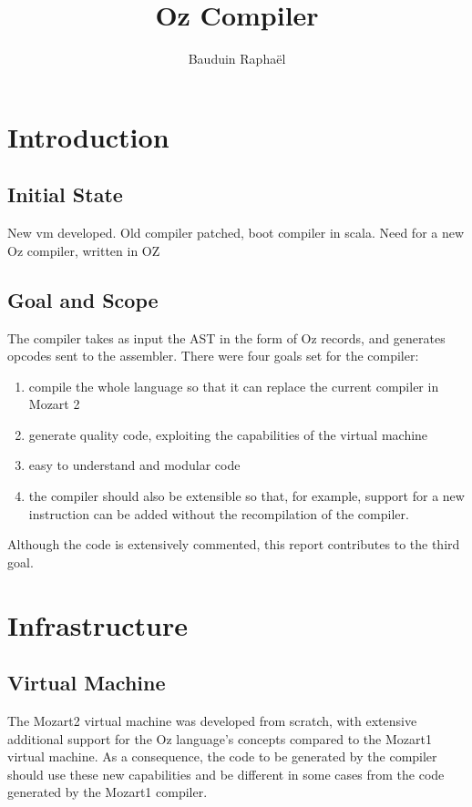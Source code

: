 \documentclass[a4paper]{memoir}
\author{Bauduin Raphaël}
\title{Oz Compiler}
\begin{document}
\lstset{language=Oz,basicstyle=\ttfamily\small,columns=fullflexible}


\ifdraftdoc
{}
\fi

\immediate{} 

\maketitle
\tableofcontents


\chapter{Introduction}
\section{Initial State}
New vm developed.
Old compiler patched, boot compiler in scala.
Need for a new Oz compiler, written in OZ

\section{Goal and Scope}
The compiler takes as input the AST in the form of Oz records, and generates opcodes sent to the assembler. 
There were four goals set for the compiler:
\begin{enumerate}
  \item compile the whole language so that it can replace the current compiler in Mozart 2
  \item generate quality code, exploiting the capabilities of the virtual machine
  \item easy to understand and modular code
  \item the compiler should also be extensible so that, for example, support for a new instruction can be added without the recompilation of the compiler.
\end{enumerate}
Although the code is extensively commented, this report contributes to the third goal.

\chapter{Infrastructure}
\section{Virtual Machine}
The Mozart2 virtual machine was developed from scratch, with extensive additional support for the Oz language's concepts compared to the Mozart1 virtual machine. As a consequence, the code to be generated by the compiler should use these new capabilities and be different in some cases from the code generated by the Mozart1 compiler.
\end{document}
